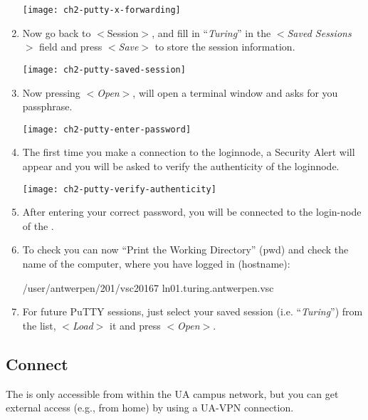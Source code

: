 \begin{enumerate}
  \texttt{[image: ch2-putty-x-forwarding]}

    \item  Now go back to $<$Session$>$, and fill in ``\emph{Turing}'' in the
      $<$\emph{Saved Sessions}$>$ field and press $<$\emph{Save}$>$ to
      store the session information.

  \texttt{[image: ch2-putty-saved-session]}

    \item  Now pressing $<$\emph{Open}$>$, will open a terminal window and
      asks for you passphrase.

  \texttt{[image: ch2-putty-enter-password]}

    \item  The first time you make a connection to the loginnode, a Security
      Alert will appear and you will be asked to verify the authenticity of the
      loginnode.

  \texttt{[image: ch2-putty-verify-authenticity]}

    \item  After entering your correct password, you will be connected to the
      login-node of the \hpc.
    \item  To check you can now ``Print the Working Directory'' (pwd) and check
      the name of the computer, where you have logged in (hostname):

  \begin{prompt}
  /user/antwerpen/201/vsc20167
  ln01.turing.antwerpen.vsc
  \end{prompt}

    \item  For future PuTTY sessions, just select your saved session (i.e.
      ``\emph{Turing}'') from the list, $<$\emph{Load}$>$ it and press
      $<$\emph{Open}$>$.
  \end{enumerate}

\fi

\subsection{Connect}
\label{sec:connect}

The \hpc is only accessible from within the UA campus network, but you can
get external access (e.g., from home) by using a UA-VPN connection.

